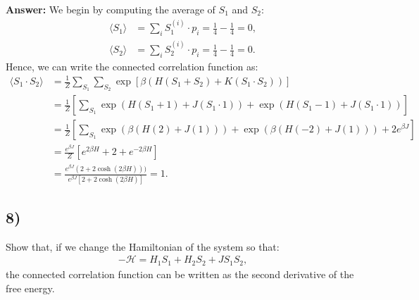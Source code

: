\documentclass[a4paper]{article}
\newcommand{\newparagraph}{\vspace{.5cm}\noindent}
\newcommand{\average}[1]{\langle #1 \rangle}
\begin{document}
\newparagraph
\textbf{Answer:} We begin by computing the average of $S_1$ and $S_2$:
\begin{align*}
    \average{S_1} &= \sum_i S_1^{(i)} \cdot p_i = \frac{1}{4} - \frac{1}{4} = 0,\\
    \average{S_2} &= \sum_i S_2^{(i)}\cdot p_i = \frac{1}{4} - \frac{1}{4} = 0.
\end{align*}Hence, we can write the connected correlation function as:
\begin{align*}
    \average{S_1\cdot S_2} &=\frac{1}{Z}\sum_{S_1}\sum_{S_2}\exp\left[\beta\left(H(S_1 + S_2) + K(S_1\cdot S_2)\right)\right]\\
    &= \frac{1}{Z}\left[\sum_{S_1}\exp\left(H(S_1 + 1) + J(S_1\cdot 1)\right) + \exp\left(H(S_1 - 1) + J(S_1 \cdot1)\right)\right]\\
    &= \frac{1}{Z}\left[\sum_{S_1}\exp\left(\beta(H(2) + J(1))\right) + \exp\left(\beta(H(-2) + J(1))\right) + 2e^{\beta J}\right]\\
    &=\frac{e^{\beta J}}{Z}\left[e^{2\beta H} + 2 + e^{-2\beta H}\right]\\
    &= \frac{e^{\beta J}(2 + 2\cosh(2\beta H)))}{e^{\beta J}\left[2 + 2\cosh(2\beta H)\right]} = 1.
\end{align*}

\subsection*{8)}
Show that, if we change the Hamiltonian of the system so that:
\begin{align*}
    -\mathcal{H} = H_1S_1 + H_2S_2 + JS_1S_2,
\end{align*}the connected correlation function can be written as the second derivative of the free energy.
\end{document}

